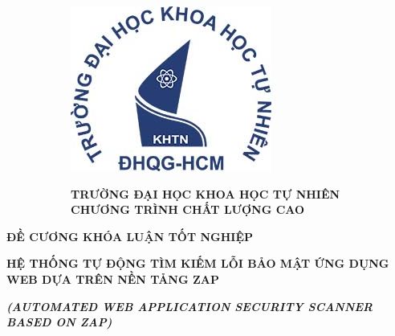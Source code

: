 \begin{titlepage}
    \centering
    \begin{figure}
        \begin{subfigure}[c][][t]{0.2\textwidth}
            \includegraphics[width=\textwidth]{images/logo.jpg}
        \end{subfigure}
        \hspace{40pt}
        \begin{subfigure}[c][][t]{0.69\textwidth}
            \centering
            \textbf{TRƯỜNG ĐẠI HỌC KHOA HỌC TỰ NHIÊN\\
                    CHƯƠNG TRÌNH CHẤT LƯỢNG CAO}
        \end{subfigure}
    \end{figure}
    
    \vspace*{20pt}

    \textbf{\large ĐỀ CƯƠNG KHÓA LUẬN TỐT NGHIỆP}\\
    
    \vspace{10pt}
    
    \textbf{\LARGE HỆ THỐNG TỰ ĐỘNG TÌM KIẾM LỖI BẢO MẬT ỨNG DỤNG WEB DỰA TRÊN NỀN TẢNG ZAP }

    \vspace{10pt}

    \textbf{\textsl{\large (AUTOMATED WEB APPLICATION SECURITY SCANNER BASED ON ZAP)}}
\end{titlepage}